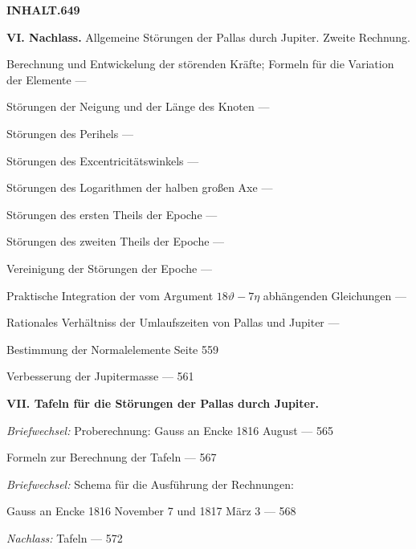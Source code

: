 \documentclass[10pt,a4paper]{article}
\newenvironment{hangparas}[2]{\setlength{\hangindent}{#1}\setlength{\hangafter}{#2}}{}
\begin{document}
\newpage

\begin{center}
\Large\textbf{INHALT.}\hfill\textbf{649}
\end{center}

\vspace{0.5em}

\begin{hangparas}{1em}{1}
\noindent\textbf{VI. Nachlass.} Allgemeine Störungen der Pallas durch Jupiter. Zweite Rechnung.

\vspace{0.2em}

\noindent\quad Berechnung und Entwickelung der störenden Kräfte; Formeln für die Variation der Elemente \hfill ---

\noindent\quad Störungen der Neigung und der Länge des Knoten \hfill ---

\noindent\quad Störungen des Perihels \hfill ---

\noindent\quad Störungen des Excentricitätswinkels \hfill ---

\noindent\quad Störungen des Logarithmen der halben großen Axe \hfill ---

\noindent\quad Störungen des ersten Theils der Epoche \hfill ---

\noindent\quad Störungen des zweiten Theils der Epoche \hfill ---

\noindent\quad Vereinigung der Störungen der Epoche \hfill ---

\noindent\quad Praktische Integration der vom Argument $18\vartheta - 7\eta$ abhängenden Gleichungen \hfill ---

\noindent\quad Rationales Verhältniss der Umlaufszeiten von Pallas und Jupiter \hfill ---

\vspace{0.2em}

\noindent\quad Bestimmung der Normalelemente \hfill Seite 559

\noindent\quad Verbesserung der Jupitermasse \hfill --- 561
\end{hangparas}

\vspace{0.5em}

\begin{hangparas}{1em}{1}
\noindent\textbf{VII. Tafeln für die Störungen der Pallas durch Jupiter.}

\vspace{0.2em}

\noindent\textit{Briefwechsel:} Proberechnung: Gauss an Encke 1816 August \hfill --- 565

\noindent Formeln zur Berechnung der Tafeln \hfill --- 567

\noindent\textit{Briefwechsel:} Schema für die Ausführung der Rechnungen:

\noindent\quad Gauss an Encke 1816 November 7 und 1817 März 3 \hfill --- 568

\noindent\textit{Nachlass:} Tafeln \hfill --- 572
\end{hangparas}
\end{document}
